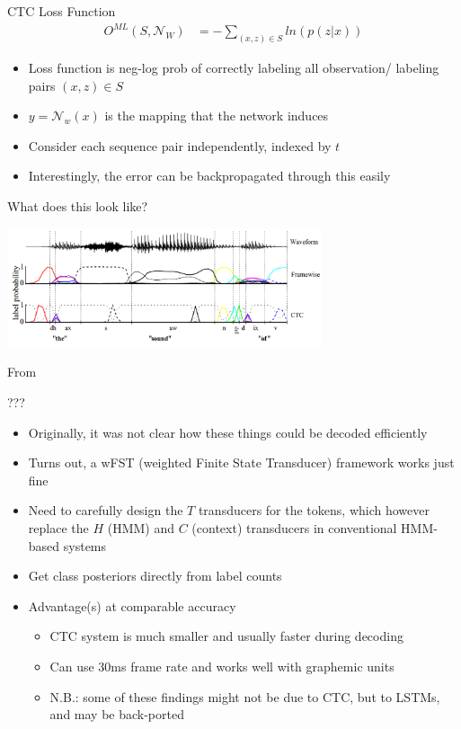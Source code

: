 \begin{frame}{CTC Loss Function}
  \begin{align}
    O^{ML}(S,\mathcal{N}_W)&=-\sum_{(x,z) \in S} ln(p(z|x))
  \end{align}
  \begin{itemize}
  \item Loss function is neg-log prob of correctly labeling all observation/ labeling pairs $(x,z) \in S$
  \item $y = \mathcal{N}_w (x)$ is the mapping that the network induces 
  \item Consider each sequence pair independently, indexed by $t$
  \item Interestingly, the error can be backpropagated through this easily
  \end{itemize}
\end{frame}

\begin{frame}{What does this look like?}
  \begin{center}
    \includegraphics[height=35mm]{figures/ctc}
  \end{center}
  \tiny From \cite{graves2006connectionist}
\end{frame}

\begin{frame}{???}
  \begin{itemize}
  \item Originally, it was not clear how these things could be decoded efficiently
  \item Turns out, a wFST (weighted Finite State Transducer) framework works just fine \cite{eesen,sak2015fast}
  \item Need to carefully design the $T$ transducers for the tokens, which however replace the $H$ (HMM) and $C$ (context) transducers in conventional HMM-based systems
  \item Get class posteriors directly from label counts
  \item Advantage(s) at comparable accuracy
    \begin{itemize}
    \item CTC system is much smaller and usually faster during decoding
    \item Can use 30ms frame rate and works well with graphemic units
    \item N.B.: some of these findings might not be due to CTC, but to LSTMs, and may be back-ported
    \end{itemize}
  \end{itemize}
\end{frame}

